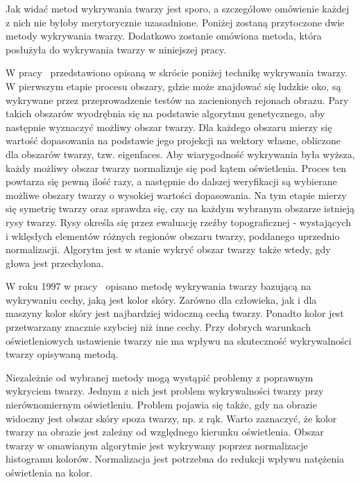 \documentclass[a4paper,twoside,12pt]{book}
\begin{document}

    Jak widać metod wykrywania twarzy jest sporo,
    a szczegółowe omówienie każdej z nich nie byłoby merytorycznie uzasadnione.
    Poniżej zostaną przytoczone dwie metody wykrywania twarzy.
    Dodatkowo zostanie omówiona metoda, która posłużyła do wykrywania twarzy w niniejszej pracy.

    W pracy~\cite{wongLamSiu}
    przedstawiono opisaną w skrócie poniżej technikę wykrywania twarzy.
    W pierwszym etapie procesu obszary, gdzie może znajdować się ludzkie oko,
    są wykrywane przez przeprowadzenie testów na zacienionych rejonach obrazu.
    Pary takich obszarów wyodrębnia się na podstawie algorytmu genetycznego,
    aby następnie wyznaczyć możliwy obszar twarzy.
    Dla każdego obszaru mierzy się wartość dopasowania na podstawie jego projekcji na wektory własne, obliczone dla
    obszarów twarzy, tzw. eigenfaces.
    Aby wiarygodność wykrywania była wyższa,
    każdy możliwy obszar twarzy normalizuje się pod kątem oświetlenia.
    Proces ten powtarza się pewną ilość razy,
    a następnie do dalszej weryfikacji są wybierane możliwe obszary twarzy o wysokiej wartości dopasowania.
    Na tym etapie mierzy się symetrię twarzy oraz sprawdza się,
    czy na każdym wybranym obszarze istnieją rysy twarzy.
    Rysy określa się przez ewaluację rzeźby topograficznej - wystających i wklęsłych elementów
    różnych regionów obszaru twarzy, poddanego uprzednio normalizacji.
    Algorytm jest w stanie wykryć obszar twarzy także wtedy, gdy głowa jest przechylona.

    W roku 1997 w pracy~\cite{clowleyCoutaz} opisano metodę wykrywania twarzy bazującą na
    wykrywaniu cechy, jaką jest kolor skóry.
    Zarówno dla człowieka, jak i dla maszyny kolor skóry jest
    najbardziej widoczną cechą twarzy.
    Ponadto kolor jest przetwarzany znacznie szybciej niż inne cechy.
    Przy dobrych warunkach oświetleniowych ustawienie twarzy nie ma wpływu na skuteczność wykrywalności twarzy
    opisywaną metodą.

    Niezależnie od wybranej metody mogą wystąpić problemy z poprawnym wykryciem twarzy.
    Jednym z nich jest problem wykrywalności twarzy przy nierównomiernym oświetleniu.
    Problem pojawia się także, gdy na obrazie widoczny jest obszar skóry spoza twarzy, np. z rąk.
    Warto zaznaczyć, że kolor twarzy na obrazie jest zależny od względnego kierunku oświetlenia.
    Obszar twarzy w omawianym algorytmie jest wykrywany poprzez normalizacje histogramu kolorów.
    Normalizacja jest potrzebna do redukcji wpływu natężenia oświetlenia na kolor.
\end{document}
